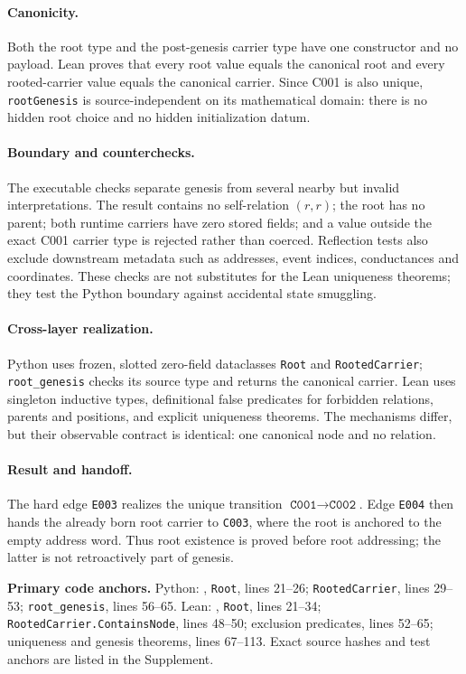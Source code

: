 \paragraph*{Canonicity.}
Both the root type and the post-genesis carrier type have one constructor and
no payload.  Lean proves that every root value equals the canonical root and
every rooted-carrier value equals the canonical carrier.  Since C001 is also
unique, \texttt{rootGenesis} is source-independent on its mathematical
domain: there is no hidden root choice and no hidden initialization datum.

\paragraph*{Boundary and counterchecks.}
The executable checks separate genesis from several nearby but invalid
interpretations.  The result contains no self-relation $(r,r)$; the root has
no parent; both runtime carriers have zero stored fields; and a value outside
the exact C001 carrier type is rejected rather than coerced.  Reflection tests
also exclude downstream metadata such as addresses, event indices,
conductances and coordinates.  These checks are not substitutes for the Lean
uniqueness theorems; they test the Python boundary against accidental state
smuggling.

\paragraph*{Cross-layer realization.}
Python uses frozen, slotted zero-field dataclasses \texttt{Root} and
\texttt{RootedCarrier}; \texttt{root\_genesis} checks its source type and
returns the canonical carrier.  Lean uses singleton inductive types,
definitional false predicates for forbidden relations, parents and positions,
and explicit uniqueness theorems.  The mechanisms differ, but their
observable contract is identical: one canonical node and no relation.

\paragraph*{Result and handoff.}
The hard edge \texttt{E003} realizes the unique transition
$\texttt{C001}\to\texttt{C002}$.  Edge \texttt{E004} then hands the already
born root carrier to \texttt{C003}, where the root is anchored to the empty
address word.  Thus root existence is proved before root addressing; the
latter is not retroactively part of genesis.

\noindent\textbf{Primary code anchors.}
Python: ,
\texttt{Root}, lines 21--26; \texttt{RootedCarrier}, lines 29--53;
\texttt{root\_genesis}, lines 56--65.  Lean:
,
\texttt{Root}, lines 21--34; \texttt{RootedCarrier.ContainsNode}, lines
48--50; exclusion predicates, lines 52--65; uniqueness and genesis theorems,
lines 67--113.  Exact source hashes and test anchors are listed in the
Supplement.
